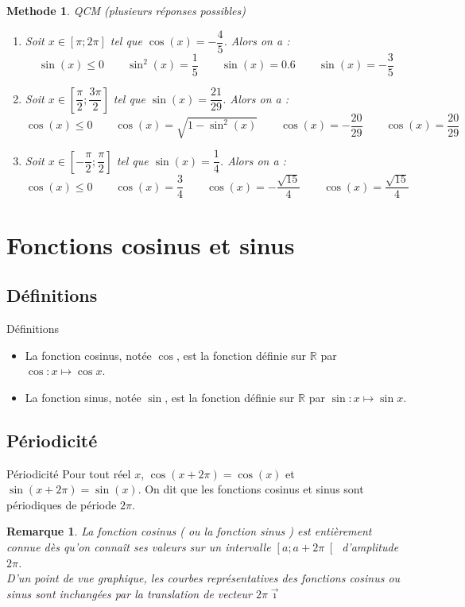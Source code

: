 \documentclass[10pt,a4paper]{article}
\newcommand{\VE}[1]{\overrightarrow{#1}}
\theoremstyle{break}
\newtheorem{Rem}{Remarque}
\newtheorem{Meth}{Methode}
\begin{document}
		\begin{Meth} QCM (plusieurs réponses possibles)
			\begin{enumerate}
				\item  Soit $x\in[\pi ; 2\pi]$ tel que $\cos(x)=-\dfrac45$. Alors on a :
				$$\sin(x) \leq 0 \qquad \sin^2(x)=\dfrac15 \qquad \sin(x)=0.6 \qquad \sin(x)=-\dfrac35$$
				\item  Soit $x\in\left[\dfrac{\pi}2 ; \dfrac{3\pi}2\right]$ tel que $\sin(x)=\dfrac{21}{29}$. Alors on a :
				$$\cos(x) \leq 0 \qquad \cos(x)=\sqrt{1-\sin^2(x)} \qquad \cos(x)=-\dfrac{20}{29} \qquad \cos(x)=\dfrac{20}{29}$$
				\item  Soit $x\in\left[-\dfrac{\pi}2 ; \dfrac{\pi}2\right]$ tel que $\sin(x)=\dfrac{1}{4}$. Alors on a :
				$$\cos(x) \leq 0 \qquad \cos(x)=\dfrac34 \qquad \cos(x)=-\dfrac{\sqrt{15}}{4} \qquad \cos(x)=\dfrac{\sqrt{15}}{4}$$
			
			
			\end{enumerate}
		
		\end{Meth}
	\newpage
	\section{Fonctions cosinus et sinus}
	\subsection{Définitions}
		\begin{bclogo}[couleur = red!25, arrondi = 0.1,logo=\bcbook]{Définitions}
	\begin{itemize}
		\item La fonction cosinus, notée $\cos$,  est la fonction définie sur $\mathbb{R}$ par $\cos : x\mapsto \cos x$.
		\item La fonction sinus, notée $\sin$,  est la fonction  définie sur $\mathbb{R}$ par $\sin : x\mapsto \sin x$.
	\end{itemize}
	\end{bclogo}
	\subsection{Périodicité}
		\begin{bclogo}[couleur = red!25, arrondi = 0.1,logo=\bcbook]{Périodicité}
	Pour tout réel $x$, $\cos \left( x+2\pi \right)= \cos(x)$ et $\sin \left( x+2\pi \right)= \sin(x)$. On dit que les fonctions cosinus et sinus sont périodiques de période $2\pi$.
\end{bclogo}
	\begin{Rem}
			La fonction cosinus ( ou la fonction sinus ) est entièrement connue dès qu'on connaît ses valeurs sur un intervalle $\left[ a ; a+ 2\pi \right[$ d'amplitude $2\pi$.\\
		
		D'un point de vue graphique, les courbes représentatives des fonctions cosinus ou sinus sont inchangées par la translation de vecteur $2\pi \VE{\imath}$
	\end{Rem}
\end{document}
